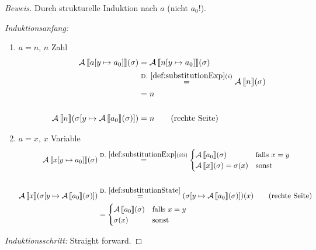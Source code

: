\begin{proof}[Beweis]
    Durch strukturelle Induktion nach $a$ (nicht $a_0$!).

    \emph{Induktionsanfang:}
    \begin{enumerate}
        \item $a = n$, $n$ Zahl
            \begin{align*}
                \A\lsem a[y \mapsto a_0] \rsem(\sigma) & = \A\lsem n[y \mapsto a_0] \rsem(\sigma) \\
                & \overset{\defrefshort{def:substitutionExp}(i)}{=} \A\lsem n \rsem(\sigma) \\
                & = n \\
                \\
                \A\lsem n \rsem(\sigma[y \mapsto \A\lsem a_0 \rsem(\sigma)]) & = n \quad\quad \text{(rechte Seite)}
            \end{align*}

        \item $a = x$, $x$ Variable
            \begin{align*}
                \A\lsem x[y \mapsto a_0] \rsem(\sigma) & \overset{\defrefshort{def:substitutionExp}(iii)}{=} \begin{cases}
                    \A\lsem a_0 \rsem(\sigma) & \text{falls } x = y \\
                    \A\lsem x \rsem(\sigma) = \sigma(x) & \text{sonst}
                \end{cases} \\
                \\
                \A\lsem x \rsem(\sigma[y \mapsto \A\lsem a_0 \rsem(\sigma)]) & \overset{\defrefshort{def:substitutionState}}{=} (\sigma[y \mapsto \A\lsem a_0 \rsem(\sigma)])(x) \quad\quad \text{(rechte Seite)} \\
                & = \begin{cases}
                    \A\lsem a_0 \rsem(\sigma) & \text{falls } x = y \\
                    \sigma(x) & \text{sonst}
                \end{cases}
            \end{align*}
    \end{enumerate}

    \emph{Induktionsschritt:} Straight forward.
\end{proof}